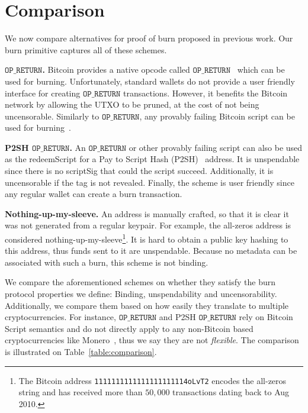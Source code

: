 \section{Comparison}

We now compare alternatives for proof of burn proposed in previous work. Our burn primitive captures all of these schemes.

\newcommand{\opreturn}{\texttt{OP\_RETURN}}

\noindent
\textbf{$\opreturn$.}
Bitcoin provides a native opcode called  $\opreturn$~\cite{bartoletti2017analysis} which can be used for burning.
Unfortunately,
standard wallets do not provide a user friendly interface for creating $\opreturn$ transactions.
However, it benefits the Bitcoin network by allowing the UTXO to be pruned, at
the cost of not being uncensorable.
Similarly to $\opreturn$, any provably failing Bitcoin script can be used for
burning~\cite{stewart}.

\noindent
\textbf{P2SH $\opreturn$.}
An $\opreturn$ or other provably failing script can also be used as the redeemScript for a Pay to Script Hash (P2SH)~\cite{p2sh} address. It is unspendable since there is no scriptSig that could the script succeed. Additionally, it is uncensorable if the tag is not revealed. Finally, the scheme is user friendly since any regular wallet can create a burn transaction.

\noindent
\textbf{Nothing-up-my-sleeve.}
An address is manually crafted, so that it is clear it was not generated from a regular keypair. For example, the all-zeros address is considered nothing-up-my-sleeve\footnote{The Bitcoin address \texttt{1111111111111111111114oLvT2} encodes the all-zeros string and has received more than $50{,}000$ transactions dating back to Aug 2010.}. It is hard to obtain a public key hashing to this address, thus funds sent to it are unspendable. Because no metadata can be associated with such a burn, this scheme is not binding.

We compare the aforementioned schemes on whether they satisfy the burn protocol properties we define: Binding, unspendability and uncensorability. Additionally, we compare them based on how easily they translate to multiple cryptocurrencies. For instance, $\opreturn$ and P2SH $\opreturn$ rely on Bitcoin Script semantics and do not directly apply to any non-Bitcoin based cryptocurrencies like Monero~\cite{van2013cryptonote}, thus we say they are not \emph{flexible}. The comparison is illustrated on Table~\ref{table:comparison}.


